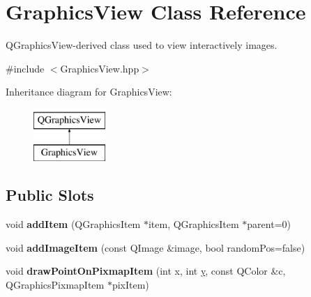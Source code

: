 \hypertarget{class_d_o_1_1_graphics_view}{\section{Graphics\-View Class Reference}
\label{class_d_o_1_1_graphics_view}
}


Q\-Graphics\-View-\/derived class used to view interactively images.  




{\ttfamily \#include $<$Graphics\-View.\-hpp$>$}

Inheritance diagram for Graphics\-View\-:\begin{figure}[H]
\begin{center}
\leavevmode
\includegraphics[height=2.000000cm]{class_d_o_1_1_graphics_view}
\end{center}
\end{figure}
\subsection*{Public Slots}
\begin{DoxyCompactItemize}
\item 
\hypertarget{class_d_o_1_1_graphics_view_a08697b6029853534915c9e3ecdc15c28}{void {\bfseries add\-Item} (Q\-Graphics\-Item $\ast$item, Q\-Graphics\-Item $\ast$parent=0)}\label{class_d_o_1_1_graphics_view_a08697b6029853534915c9e3ecdc15c28}

\item 
\hypertarget{class_d_o_1_1_graphics_view_a34f377b6ef0f039b94282e6da9c0df08}{void {\bfseries add\-Image\-Item} (const Q\-Image \&image, bool random\-Pos=false)}\label{class_d_o_1_1_graphics_view_a34f377b6ef0f039b94282e6da9c0df08}

\item 
\hypertarget{class_d_o_1_1_graphics_view_a743cbf84024a728d5ec8f20fadf859d0}{void {\bfseries draw\-Point\-On\-Pixmap\-Item} (int x, int \hyperlink{group___channel_accessors_gac90c52c5b3a7b2a7e3761e6e84f25778}{y}, const Q\-Color \&c, Q\-Graphics\-Pixmap\-Item $\ast$pix\-Item)}\label{class_d_o_1_1_graphics_view_a743cbf84024a728d5ec8f20fadf859d0}

\end{DoxyCompactItemize}
